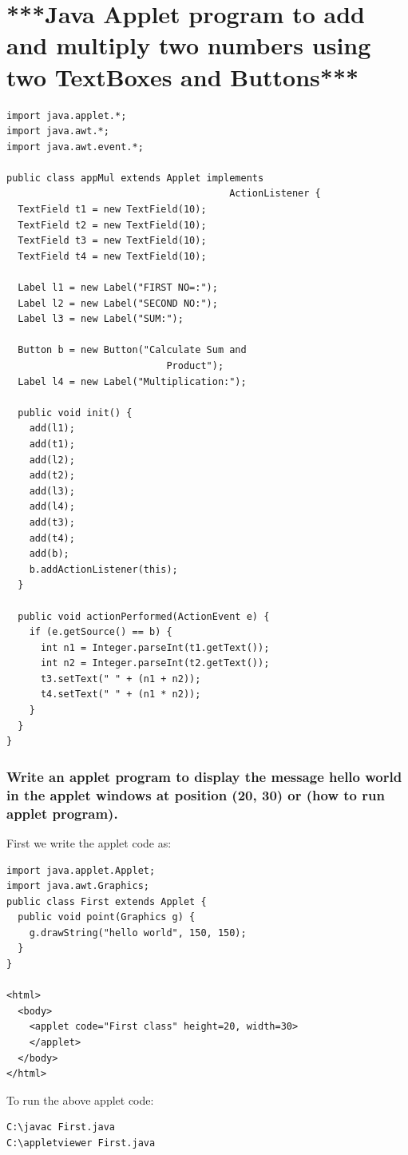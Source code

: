 \documentclass[twocolumn, a4paper]{article}
\begin{document}
\section{***Java Applet program to add and multiply two numbers using two
TextBoxes and Buttons***}
\begin{lstlisting}
import java.applet.*;
import java.awt.*;
import java.awt.event.*;

public class appMul extends Applet implements
                                       ActionListener {
  TextField t1 = new TextField(10);
  TextField t2 = new TextField(10);
  TextField t3 = new TextField(10);
  TextField t4 = new TextField(10);

  Label l1 = new Label("FIRST NO=:");
  Label l2 = new Label("SECOND NO:");
  Label l3 = new Label("SUM:");

  Button b = new Button("Calculate Sum and
                            Product");
  Label l4 = new Label("Multiplication:");

  public void init() {
    add(l1);
    add(t1);
    add(l2);
    add(t2);
    add(l3);
    add(l4);
    add(t3);
    add(t4);
    add(b);
    b.addActionListener(this);
  }

  public void actionPerformed(ActionEvent e) {
    if (e.getSource() == b) {
      int n1 = Integer.parseInt(t1.getText());
      int n2 = Integer.parseInt(t2.getText());
      t3.setText(" " + (n1 + n2));
      t4.setText(" " + (n1 * n2));
    }
  }
}
\end{lstlisting}

\subsubsection{Write an applet program to display the message hello world in
the applet windows at position (20, 30) or (how to run applet program).}
First we write the applet code as:
\begin{lstlisting}
import java.applet.Applet;
import java.awt.Graphics;
public class First extends Applet {
  public void point(Graphics g) {
    g.drawString("hello world", 150, 150);
  }
}

<html>
  <body>
    <applet code="First class" height=20, width=30>
    </applet>
  </body>
</html>
\end{lstlisting}

To run the above applet code:
\begin{verbatim}
C:\javac First.java
C:\appletviewer First.java
\end{verbatim}
\end{document}
